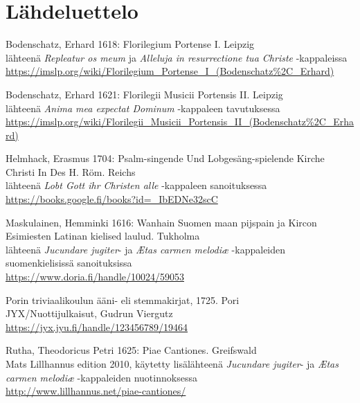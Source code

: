 \chapter*{Lähdeluettelo}

Bodenschatz, Erhard 1618: Florilegium Portense I. Leipzig \\
lähteenä \emph{Repleatur os meum} ja \emph{Alleluja in resurrectione tua Christe} -kappaleissa \\
\url{https://imslp.org/wiki/Florilegium\_Portense\_I\_(Bodenschatz%2C\_Erhard)}

Bodenschatz, Erhard 1621: Florilegii Musicii Portensis II. Leipzig \\
lähteenä \emph{Anima mea expectat Dominum} -kappaleen tavutuksessa \\
\url{https://imslp.org/wiki/Florilegii\_Musicii\_Portensis\_II\_(Bodenschatz%2C\_Erhard)}

Helmhack, Erasmus 1704: Psalm-singende Und Lobgesäng-spielende Kirche Christi In Des H. Röm. Reichs \\
lähteenä \emph{Lobt Gott ihr Christen alle} -kappaleen sanoituksessa \\
\url{https://books.google.fi/books?id=\_IbEDNe32scC}

Maskulainen, Hemminki 1616: Wanhain Suomen maan pijspain ja Kircon Esimiesten Latinan kielised laulud. Tukholma \\
lähteenä \emph{Jucundare jugiter}- ja \emph{Ætas carmen melodiæ} -kappaleiden suomenkielisissä sanoituksissa \\
\url{https://www.doria.fi/handle/10024/59053}

Porin triviaalikoulun ääni- eli stemmakirjat, 1725. Pori \\
JYX/Nuottijulkaisut, Gudrun Viergutz \\
\url{https://jyx.jyu.fi/handle/123456789/19464}

Rutha, Theodoricus Petri 1625: Piae Cantiones. Greifswald \\
Mats Lillhannus edition 2010, käytetty lisälähteenä \emph{Jucundare jugiter}- ja \emph{Ætas carmen melodiæ} -kappaleiden nuotinnoksessa \\
\url{http://www.lillhannus.net/piae-cantiones/}
